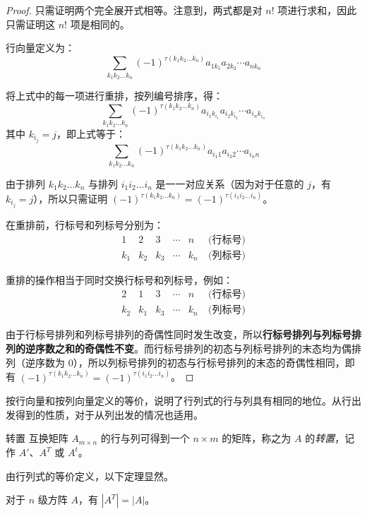 \begin{proof}
	只需证明两个完全展开式相等。注意到，两式都是对 $n!$ 项进行求和，因此只需证明这 $n!$ 项是相同的。

	行向量定义为：
	$$
	\sum_{k_1 k_2 \ldots k_n} (-1)^{\tau(k_1 k_2 \ldots k_n)} a_{1k_1} a_{2k_2} \cdots a_{nk_n}
	$$

	将上式中的每一项进行重排，按列编号排序，得：
	$$
	\sum_{k_1 k_2 \ldots k_n} (-1)^{\tau(k_1 k_2 \ldots k_n)} a_{i_1 k_{i_1}} a_{i_2 k_{i_2}} \cdots a_{i_n k_{i_n}}
	$$
	其中 $k_{i_j} = j$，即上式等于：
	$$
	\sum_{k_1 k_2 \ldots k_n} (-1)^{\tau(k_1 k_2 \ldots k_n)} a_{i_1 1} a_{i_2 2} \cdots a_{i_n n}
	$$

	由于排列 $k_1 k_2 \ldots k_n$ 与排列 $i_1 i_2 \ldots i_n$ 是一一对应关系（因为对于任意的 $j$，有 $k_{i_j} = j$），所以只需证明 $(-1)^{\tau(k_1 k_2 \ldots k_n)} = (-1)^{\tau(i_1 i_2 \ldots i_n)}$。

	\bigskip

	在重排前，行标号和列标号分别为：
	$$
	\begin{matrix}
		1 & 2 & 3 & \cdots & n & \pod{\text{行标号}}
		\\
		k_1 & k_2 & k_3 & \cdots & k_n & \pod{\text{列标号}}
	\end{matrix}
	$$

	重排的操作相当于同时交换行标号和列标号，例如：
	$$
	\begin{matrix}
		2 & 1 & 3 & \cdots & n & \pod{\text{行标号}}
		\\
		k_2 & k_1 & k_3 & \cdots & k_n & \pod{\text{列标号}}
	\end{matrix}
	$$

	由于行标号排列和列标号排列的奇偶性同时发生改变，所以\textbf{行标号排列与列标号排列的逆序数之和的奇偶性不变}。而行标号排列的初态与列标号排列的末态均为偶排列（逆序数为 $0$），所以列标号排列的初态与行标号排列的末态的奇偶性相同，即有 $(-1)^{\tau(k_1 k_2 \ldots k_n)} = (-1)^{\tau(i_1 i_2 \ldots i_n)}$。
\end{proof}

按行向量和按列向量定义的等价，说明了行列式的行与列具有相同的地位。从行出发得到的性质，对于从列出发的情况也适用。

\begin{definition}{转置}
	互换矩阵 $A_{m \times n}$ 的行与列可得到一个 $n \times m$ 的矩阵，称之为 $A$ 的\emph{转置}，记作 $A'$、$A^T$ 或 $A^t$。
\end{definition}

由行列式的等价定义，以下定理显然。

\begin{theorem}
	对于 $n$ 级方阵 $A$，有 $|A^T| = |A|$。
\end{theorem}

